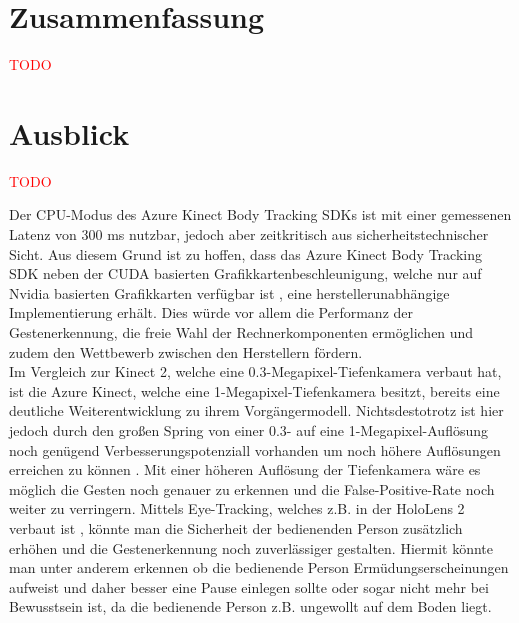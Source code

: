 \section{Zusammenfassung}

\textcolor{red}{TODO}

\section{Ausblick}
\textcolor{red}{TODO}



Der CPU-Modus des Azure Kinect Body Tracking SDKs ist mit einer gemessenen Latenz von 300 ms nutzbar, jedoch aber zeitkritisch aus sicherheitstechnischer Sicht. Aus diesem Grund ist zu hoffen, dass das Azure Kinect Body Tracking SDK neben der CUDA basierten Grafikkartenbeschleunigung, welche nur auf Nvidia basierten Grafikkarten verfügbar ist \cite{encausse_body_nodate}, eine herstellerunabhängige Implementierung erhält. Dies würde vor allem die Performanz der Gestenerkennung, die freie Wahl der Rechnerkomponenten ermöglichen und zudem den Wettbewerb zwischen den Herstellern fördern.\\

Im Vergleich zur Kinect 2, welche eine \num{0,3}-Megapixel-Tiefenkamera verbaut hat, ist die Azure Kinect, welche eine 1-Megapixel-Tiefenkamera besitzt, bereits eine deutliche Weiterentwicklung zu ihrem Vorgängermodell. Nichtsdestotrotz ist hier jedoch durch den großen Spring von einer \num{0,3}- auf eine 1-Megapixel-Auflösung noch genügend Verbesserungspotenziall vorhanden um noch höhere Auflösungen erreichen zu können \cite{bamji__2018}. Mit einer höheren Auflösung der Tiefenkamera wäre es möglich die Gesten noch genauer zu erkennen und die False-Positive-Rate noch weiter zu verringern. Mittels Eye-Tracking, welches z.B. in der HoloLens 2 verbaut ist \cite{hololens2_hardware_nodate}, könnte man die Sicherheit der bedienenden Person zusätzlich erhöhen und die Gestenerkennung noch zuverlässiger gestalten. Hiermit könnte man unter anderem erkennen ob die bedienende Person Ermüdungserscheinungen aufweist und daher besser eine Pause einlegen sollte oder sogar nicht mehr bei Bewusstsein ist, da die bedienende Person z.B. ungewollt auf dem Boden liegt.\\

